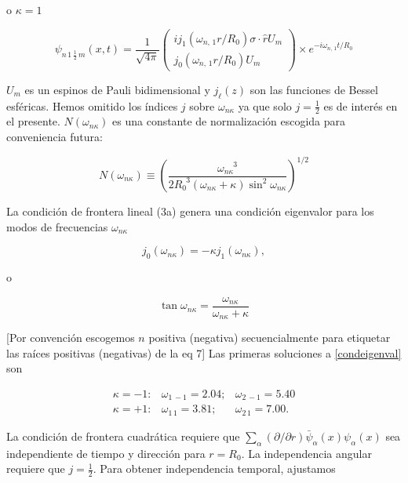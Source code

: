o ${\kappa} = 1$

\begin{equation}
{\psi}_{n \, 1 \, \frac{1}{2} \, m} (x,t) = \frac{1}{\sqrt{4 \pi}} 
\left( 
\begin{array}{c}
i{j}_{1} ({\omega}_{n, \, 1} r / {R}_{0}) \sigma \cdot \hat{r} {U}_{m} \\
{j}_{0} ({\omega}_{n, \, 1} r / {R}_{0}) {U}_{m} 
\end{array}
\right) \times {e}^{- i {\omega}_{n, \, 1} t / {R}_{0}}
\end{equation}

${U}_{m}$ es un espinos de Pauli bidimensional y ${j}_{\ell}(z)$ son las funciones de Bessel esféricas. Hemos omitido los índices $j$ sobre ${\omega}_{n \kappa}$ ya que solo $j = \frac{1}{2}$ es de interés en el presente. $N({\omega}_{n \kappa})$ es una constante de normalización escogida para conveniencia futura:

\begin{equation}
N({\omega}_{n \kappa}) \equiv \left( \frac{{\omega}_{n \kappa}^{\phantom{n \kappa} 3}}{2 {R}_{0}^{\phantom{0} 3} ({\omega}_{n \kappa} + \kappa) \sin^{2} {\omega}_{n \kappa}} \right)^{1/2}
\end{equation}

La condición de frontera lineal (3a) genera una condición eigenvalor para los modos de frecuencias ${\omega}_{n \kappa}$

$$
{j}_{0}({\omega}_{n \kappa}) = - \kappa {j}_{1} ({\omega}_{n \kappa}),
$$

o 

\begin{equation}\label{condeigenval}
\tan {\omega}_{n \kappa} = \frac{{\omega}_{n \kappa}}{{\omega}_{n \kappa} + \kappa}
\end{equation}

[Por convención escogemos $n$ positiva (negativa) secuencialmente para etiquetar las raíces positivas (negativas) de la eq 7] Las primeras soluciones a \eqref{condeigenval} son 

\begin{equation}
\begin{array}{ccc}
\kappa = - 1: & {\omega}_{1 \, -1} = 2.04; & {\omega}_{2 \, -1} = 5.40 \\
\kappa = + 1: & {\omega}_{1 \, 1} = 3.81; & {\omega}_{2 \, 1} = 7.00.
\end{array}
\end{equation}

La condición de frontera cuadrática requiere que $\sum_{\alpha} (\partial / \partial r) \bar{\psi}_{\alpha} (x) {\psi}_{\alpha}(x)$ sea independiente de tiempo y dirección para $r={R}_{0}$. La independencia angular requiere que $j = \frac{1}{2}$. Para obtener independencia temporal, ajustamos

